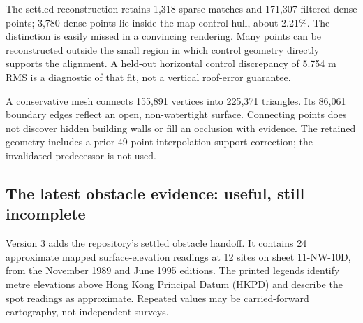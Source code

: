 
The settled reconstruction retains 1,318 sparse matches and 171,307 filtered dense points; 3,780 dense points lie inside the map-control hull, about 2.21\%. The distinction is easily missed in a convincing rendering. Many points can be reconstructed outside the small region in which control geometry directly supports the alignment. A held-out horizontal control discrepancy of 5.754 m RMS is a diagnostic of that fit, not a vertical roof-error guarantee.

A conservative mesh connects 155,891 vertices into 225,371 triangles. Its 86,061 boundary edges reflect an open, non-watertight surface. Connecting points does not discover hidden building walls or fill an occlusion with evidence. The retained geometry includes a prior 49-point interpolation-support correction; the invalidated predecessor is not used.

\par\medskip
\subsection*{The latest obstacle evidence: useful, still incomplete}
Version 3 adds the repository's settled obstacle handoff. It contains 24 approximate mapped surface-elevation readings at 12 sites on sheet 11-NW-10D, from the November 1989 and June 1995 editions. The printed legends identify metre elevations above Hong Kong Principal Datum (HKPD) and describe the spot readings as approximate. Repeated values may be carried-forward cartography, not independent surveys.


